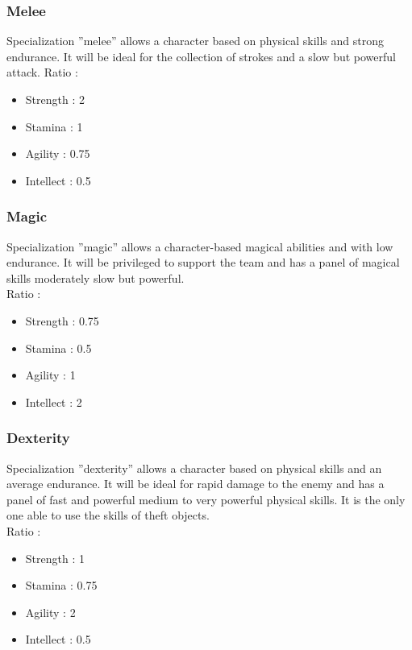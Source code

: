 \documentclass[a4paper,12pt]{book}
\begin{document}
\subsubsection{Melee}
Specialization ''melee'' allows a character based on physical skills and strong endurance. It will be ideal for the collection of strokes and a slow but powerful attack. \newpage
Ratio :
\begin{itemize}
\item Strength : 2
\item Stamina : 1
\item Agility : 0.75
\item Intellect : 0.5
\end{itemize}
\subsubsection{Magic}
Specialization ''magic'' allows a character-based magical abilities and with low endurance. It will be privileged to support the team and has a panel of magical skills moderately slow but powerful. \\
Ratio :
\begin{itemize}
\item Strength : 0.75
\item Stamina : 0.5
\item Agility : 1
\item Intellect : 2
\end{itemize}
\subsubsection{Dexterity}
Specialization ''dexterity'' allows a character based on physical skills and an average endurance. It will be ideal for rapid damage to the enemy and has a panel of fast and powerful medium to very powerful physical skills. It is the only one able to use the skills of theft objects. \\
Ratio :
\begin{itemize}
\item Strength : 1
\item Stamina : 0.75
\item Agility : 2
\item Intellect : 0.5
\end{itemize}
\end{document}
